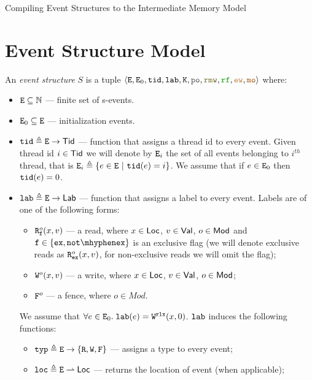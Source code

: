 \documentclass[12pt]{article}
\begin{document}
\begin{center}
{\center \LARGE Compiling Event Structures to the Intermediate Memory Model }
\end{center}

\section{Event Structure Model}

\begin{definition}
  \label{def:es}
  
  An \emph{event structure} $S$ is a tuple
  $\tup{\lE, \lEo, \lTID, \lLAB, \lCONT, \lPO, \lRMW, \lRF, \lEW, \lMO}$ where:
  \begin{itemize}
  \item $\lE \subseteq \N$ --- finite set of s-events. 
  \item $\lEo \subseteq \lE$ --- initialization events.
  \item $\lTID \defeq \lE \fun \Tid$ --- function that assigns a thread id to every event.
    Given thread id $i \in \Tid$ we will denote by $\lEi{i}$ the set of all events belonging 
    to $i^{th}$ thread, that is $\lEi{i} \defeq \{e \in \lE ~|~ \lTID(e) = i\}$.
    We assume that if $e \in \lEo$ then $\lTID(e) = 0$.
  \item $\lLAB \defeq \lE \fun \Lab$ --- function that assigns a label to every event.
    Labels are of one of the following forms:
    \begin{itemize}
      \item $\rlabExExpl{o}{x}{v}{\mathtt{f}}$ --- a read, where
        $x \in \Loc$, $v \in \Val$, $o \in \Mod$ 
        and $\mathtt{f} \in \{\Ex, \NotEx\}$ is an exclusive flag 
        (we will denote exclusive reads as $\rlabEx{o}{x}{v}$,
        for non-exclusive reads we will omit the flag);
      \item $\wlab{o}{x}{v}$ --- a write, where $x \in \Loc$, $v \in \Val$, $o \in \Mod$;
      \item $\flab{o}$ --- a fence, where $o \in Mod$.
    \end{itemize}
    We assume that $\forall{e} \in \lEo. \; \lLAB(e) = \wlab{\rlx}{x}{0}$.
    $\lLAB$ induces the following functions:
    \begin{itemize}
      \item $\lTYP \defeq \lE \fun \{\lR, \lW, \lF\}$ --- assigns a type to every event;
      \item $\lLOC \defeq \lE \pfun \Loc $ --- returns the location of event (when applicable);

\end{itemize}
\end{itemize}
\end{definition}
\end{document}
